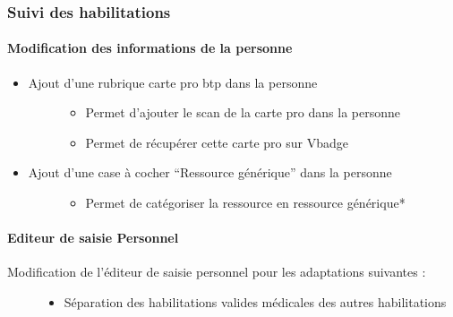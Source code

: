 \documentclass[letterpaper,10pt,english]{sphinxmanual}
\begin{document}
\subsubsection{Suivi des habilitations}
\label{\detokenize{maj/maj_30092019:suivi-des-habilitations}}

\paragraph{Modification des informations de la personne}
\label{\detokenize{maj/maj_30092019:modification-des-informations-de-la-personne}}\begin{itemize}
\item {} \begin{description}
\item[{Ajout d’une rubrique carte pro btp dans la personne}] \leavevmode\begin{itemize}
\item {} 
Permet d’ajouter le scan de la carte pro dans la personne

\item {} 
Permet de récupérer cette carte pro sur Vbadge

\end{itemize}

\end{description}

\item {} \begin{description}
\item[{Ajout d’une case à cocher “Ressource générique” dans la personne}] \leavevmode\begin{itemize}
\item {} 
Permet de catégoriser la ressource en ressource générique*

\end{itemize}

\end{description}

\end{itemize}


\paragraph{Editeur de saisie Personnel}
\label{\detokenize{maj/maj_30092019:editeur-de-saisie-personnel}}\begin{description}
\item[{Modification de l’éditeur de saisie personnel pour les adaptations suivantes :}] \leavevmode\begin{itemize}
\item {} 
Séparation des habilitations valides médicales des autres habilitations

\end{itemize}

\end{description}
\end{document}
